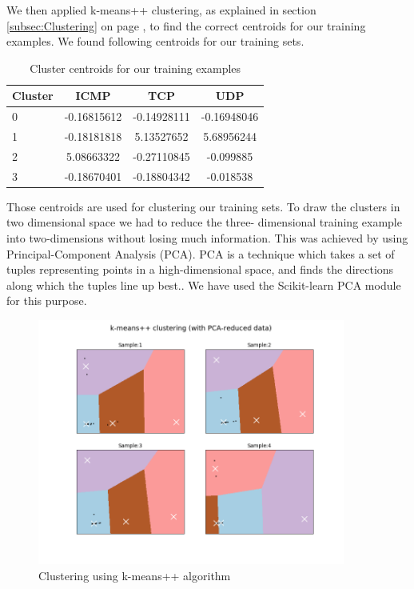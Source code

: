 \documentclass[12pt,oneside,a4paper]{article}
\begin{document}
We then applied k-means++ clustering, as explained in section \ref{subsec:Clustering} on page \pageref{subsec:Clustering}, to find the correct centroids for our training examples. We found following centroids for our training sets.

\begin{table}[H]
\centering
  \begin{tabular}{ l | c  c  c }
    Cluster      & ICMP  & TCP  & UDP \\
    \hline
    0         &{-0.16815612}       &{-0.14928111}    &{-0.16948046} \\
    1         &{-0.18181818}       &{5.13527652}     &{5.68956244} \\
    2         &{5.08663322}        &{-0.27110845}    &{-0.099885} \\
    3         &{-0.18670401}       &{-0.18804342}    &{-0.018538} \\
  \end{tabular}
\caption{Cluster centroids for our training examples} \label{table:centroids}
\end{table}

Those centroids are used for clustering our training sets. To draw the clusters in two dimensional space we had to reduce the three- dimensional training example into two-dimensions without losing much information. This was achieved by using Principal-Component Analysis (PCA). PCA is a technique which takes a set of tuples representing points in a high-dimensional space, and finds the directions along which the tuples line up best.\cite{pca}. We have used the Scikit-learn PCA module for this purpose.

\begin{figure}[H]
\centering
\includegraphics[width=0.90\textwidth]{kemans-clustering.png}
\caption{Clustering using k-means++ algorithm} \label{fig:k-means-clustering}
\end{figure}
\end{document}
